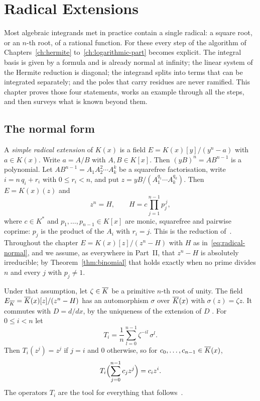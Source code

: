 \chapter{Radical Extensions}\label{ch:radical}

Most algebraic integrands met in practice contain a single radical: a square
root, or an $n$-th root, of a rational function. For these every step of
the algorithm of Chapters~\ref{ch:hermite} to~\ref{ch:logarithmic-part}
becomes explicit. The integral basis is given by a formula and is already
normal at infinity; the linear system of the Hermite reduction is diagonal;
the integrand splits into terms that can be integrated separately; and the
poles that carry residues are never ramified. This chapter proves those four
statements, works an example through all the steps, and then surveys what is
known beyond them.

\section{The normal form}\label{sec:radical-normal}

A \emph{simple radical extension} of $K(x)$ is a field $E = K(x)[y]/(y^n -
a)$ with $a \in K(x)$. Write $a = A/B$ with $A, B \in K[x]$. Then $(yB)^n = A
B^{n-1}$ is a polynomial. Let $A B^{n-1} = A_1 A_2^2 \cdots A_k^k$ be a
squarefree factorisation, write $i = n\,q_i + r_i$ with $0 \le r_i < n$, and
put $z = y B / (A_1^{q_1} \cdots A_k^{q_k})$. Then $E = K(x)(z)$ and
\begin{equation}\label{eq:radical-normal}
  z^n = H, \qquad H = c \prod_{j=1}^{n-1} p_j^{\,j},
\end{equation}
where $c \in K^*$ and $p_1, \dots, p_{n-1} \in K[x]$ are monic, squarefree and
pairwise coprime: $p_j$ is the product of the $A_i$ with $r_i = j$. This is
the reduction of~\cite[\S2.2]{bronstein1998tutorial}. Throughout the chapter
$E = K(x)[z]/(z^n - H)$ with $H$ as in~\eqref{eq:radical-normal}, and we
assume, as everywhere in Part~II, that $z^n - H$ is absolutely irreducible;
by Theorem~\ref{thm:binomial} that holds exactly when no prime divides $n$
and every $j$ with $p_j \ne 1$.

Under that assumption, let $\zeta \in \overline{K}$ be a primitive $n$-th root of
unity. The field $E_{\overline{K}} = \overline{K}(x)[z]/(z^n - H)$ has an automorphism
$\sigma$ over $\overline{K}(x)$ with $\sigma(z) = \zeta z$. It commutes with $D =
d/dx$, by the uniqueness of the extension of $D$ . For
$0 \le i < n$ let
\begin{equation}\label{eq:projector}
  T_i = \frac{1}{n} \sum_{l=0}^{n-1} \zeta^{-il}\, \sigma^l .
\end{equation}
Then $T_i(z^j) = z^j$ if $j = i$ and $0$ otherwise, so for $c_0, \dots,
c_{n-1} \in \overline{K}(x)$,
\[
  T_i \Bigl( \sum_{j=0}^{n-1} c_j z^j \Bigr) = c_i z^i .
\]
The operators $T_i$ are the tool for everything that
follows~\cite[\S2.5 and Appendix~A]{trager1984}.

